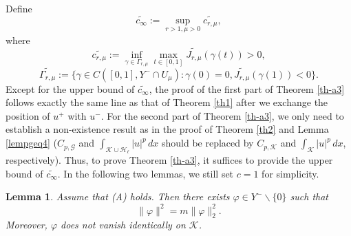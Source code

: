 \documentclass[11pt]{amsart}
\newtheorem{lemma}[theorem]{Lemma}
\newcommand{\norm}[1]{\lVert#1\rVert}
\newcommand{\G}{\mathcal{G}}
\newcommand{\K}{\mathcal{K}}
\numberwithin{equation}{section}
\begin{document}
Define
$$
\widetilde{c_{\infty}}:=\sup _{ r>1, \mu>0} \widetilde{c_{r, \mu}},
$$
where
$$\widetilde{c_{r, \mu}} := \inf _{\gamma \in \Gamma_{r, \mu}} \max _{t \in[0,1]} \widetilde{J_{r, \mu}}(\gamma(t))>0,$$
$$
\widetilde{\Gamma_{r, \mu}} :=\{\gamma \in C([0,1], Y^{-} \cap U_{\mu}): \gamma(0)=0, \widetilde{J_{ r, \mu}}(\gamma(1))<0\}.
$$
Except for the upper bound of $\widetilde{c_\infty}$, the proof of the first part of Theorem \ref{th-a3} follows exactly the same line as that of Theorem \ref{th1} after we exchange the position of $u^+$ with $u^-$. For the second part of Theorem \ref{th-a3}, we only need to establish a non-existence result as in the proof of Theorem \ref{th2} and Lemma \ref{lempgeq4} ($C_{p,\G}$ and $\int_{\K\cup\mathcal{H}_\ell}|u|^{p}\,dx$ should be replaced by $C_{p,\K}$ and $\int_{\K}|u|^{p}\,dx$, respectively). Thus, to prove Theorem \ref{th-a3}, it suffices to provide the upper bound of $\widetilde{c_\infty}$. In the following two lemmas, we still set $c=1$ for simplicity.
\begin{lemma}\label{lemeg}
    Assume that {\rm(A)} holds. Then there exists $\varphi \in Y^-\backslash\{0\}$ such that
    \begin{equation*}
        \norm{\varphi}^2=m\norm{\varphi}_2^2.
    \end{equation*}
Moreover, $\varphi$ does not vanish identically on $\K$.
\end{lemma}
\end{document}
